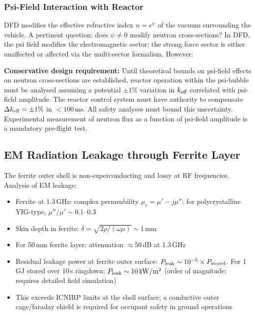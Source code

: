 \documentclass[11pt,a4paper]{article}
\begin{document}
\subsubsection{Psi-Field Interaction with Reactor}
\label{sec:psi_nuclear}

DFD modifies the effective refractive index $n = e^\psi$ of the vacuum
surrounding the vehicle. A pertinent question: does $\psi \neq 0$ modify
neutron cross-sections? In DFD, the psi field modifies the electromagnetic
sector; the strong force sector is either unaffected or affected via the
multi-sector formalism. However:

\begin{notebox}
\textbf{Conservative design requirement:} Until theoretical bounds on
psi-field effects on neutron cross-sections are established, reactor
operation within the psi-bubble must be analysed assuming a potential
$\pm 1\%$ variation in $k_{\rm eff}$ correlated with psi-field
amplitude. The reactor control system must have authority to compensate
$\Delta k_{\rm eff} = \pm 1\%$ in $< 100$\,ms. All safety analyses
must bound this uncertainty. Experimental measurement of neutron flux
as a function of psi-field amplitude is a mandatory pre-flight test.
\end{notebox}

\subsection{EM Radiation Leakage through Ferrite Layer}

The ferrite outer shell is non-superconducting and lossy at RF frequencies.
Analysis of EM leakage:

\begin{itemize}
  \item Ferrite at 1.3\,GHz: complex permeability $\mu_r = \mu' - j\mu''$;
    for polycrystalline YIG-type, $\mu'' / \mu' \sim 0.1$--$0.3$
  \item Skin depth in ferrite: $\delta = \sqrt{2\rho/(\omega\mu)} \sim 1$\,mm
  \item For 50\,mm ferrite layer: attenuation $\approx 50$\,dB at 1.3\,GHz
  \item Residual leakage power at ferrite outer surface:
    $P_{\rm leak} \sim 10^{-5} \times P_{\rm stored}$. For 1\,GJ stored
    over 10\,s ringdown: $P_{\rm leak} \sim 10\,\si{kW/m^2}$ (order of
    magnitude; requires detailed field simulation)
  \item This exceeds ICNIRP limits at the shell surface; a conductive
    outer cage/faraday shield is required for occupant safety in
    ground operations
\end{itemize}
\end{document}
